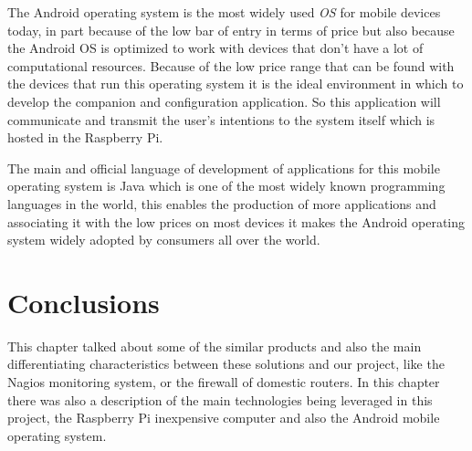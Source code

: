 The Android operating system is the most widely used \emph{\ac{OS}} for mobile
devices today, in part because of the low bar of entry in terms of price but
also because the Android OS is optimized to work with devices that don't have a
lot of computational resources. Because of the low price range that can be found
with the devices that run this operating system it is the ideal environment in
which to develop the companion and configuration application. So this
application will communicate and transmit the user's intentions to the system
itself which is hosted in the Raspberry Pi.

The main and official language of development of applications for this mobile
operating system is Java which is one of the most widely known programming
languages in the world, this enables the production of more applications and
associating it with the low prices on most devices it makes the Android
operating system widely adopted by consumers all over the world.


\section{Conclusions}
\label{chap2:sec:concs}
This chapter talked about some of the similar products and also the main
differentiating characteristics between these solutions and our project, like
the Nagios monitoring system, or the firewall of domestic routers.
In this chapter there was also a description of the main technologies being
leveraged in this project, the Raspberry Pi inexpensive computer and also the
Android mobile operating system.
